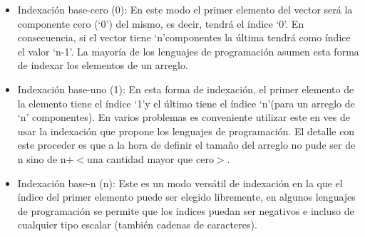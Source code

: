 \begin{itemize}
	\item Indexación base-cero (0): En este modo el primer elemento del vector será la componente cero (\textquoteleft0\textquoteright) del mismo, es decir, tendrá el índice \textquoteleft0\textquoteright. En consecuencia, si el vector tiene \textquoteleft n\textquoteright componentes la última tendrá como índice el valor \textquoteleft n-1\textquoteright. La mayoría de los lenguajes de programación asumen esta forma  de indexar los elementos de un arreglo.
	\item Indexación base-uno (1): En esta forma de indexación, el primer elemento de la elemento tiene el índice \textquoteleft1\textquoteright y el último tiene el índice \textquoteleft n\textquoteright (para un arreglo de \textquoteleft n' componentes). En varios problemas es conveniente utilizar este en ves de usar la indexación que propone los lenguajes de programación. El detalle con este proceder es que a la hora de definir el tamaño del arreglo no pude ser de n sino de n+$<$una cantidad mayor que cero$>$. 
	\item Indexación base-n (n): Este es un modo versátil de indexación en la que el índice del primer elemento puede ser elegido libremente, en algunos lenguajes de programación se permite que los índices puedan ser negativos e incluso de cualquier tipo escalar (también cadenas de caracteres).
\end{itemize}